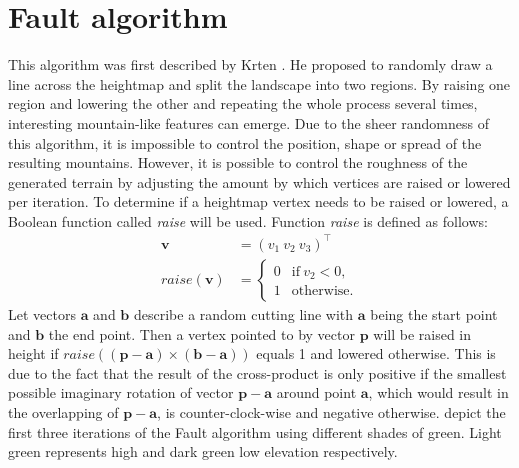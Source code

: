 \documentclass[11pt,a4paper,twoside,openright]{report}
\begin{document}
\section{Fault algorithm}
This algorithm was first described by Krten \cite{Krten:1994}. He proposed to randomly draw a line across the heightmap and split the landscape into two regions. By raising one region and lowering the other and repeating the whole process several times, interesting mountain-like features can emerge. Due to the sheer randomness of this algorithm, it is impossible to control the position, shape or spread of the resulting mountains. However, it is possible to control the roughness of the generated terrain by adjusting the amount by which vertices are raised or lowered per iteration. To determine if a heightmap vertex needs to be raised or lowered, a Boolean function called \emph{raise} will be used. Function \emph{raise} is defined as follows:
\begin{align}
\mathbf{v} &= (v_1\ v_2\ v_3)^\intercal \\
raise(\mathbf{v}) &=
\begin{cases}
  0 & \text{if}\ v_2 < 0, \\
  1 & \text{otherwise}.
\end{cases}
\end{align}
Let vectors $\mathbf{a}$ and $\mathbf{b}$ describe a random cutting line with $\mathbf{a}$ being the start point and $\mathbf{b}$ the end point. Then a vertex pointed to by vector $\mathbf{p}$ will be raised in height if $raise((\mathbf{p}-\mathbf{a}) \times (\mathbf{b} - \mathbf{a}))$ equals 1 and lowered otherwise. This is due to the fact that the result of the cross-product is only positive if the smallest possible imaginary rotation of vector $\mathbf{p}-\mathbf{a}$ around point $\mathbf{a}$, which would result in the overlapping of $\mathbf{p}-\mathbf{a}$, is counter-clock-wise and negative otherwise.  depict the first three iterations of the Fault algorithm using different shades of green. Light green represents high and dark green low elevation respectively.
\end{document}
